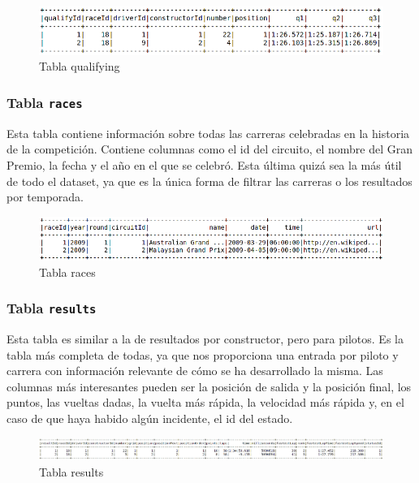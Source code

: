 \documentclass[12pt,twoside,titlepage]{report}
\begin{document}
\begin{figure}[H]
  \includegraphics[scale=0.4]{qualifying_table.png}
  \centering
  \caption{Tabla qualifying}
  \label{fig:quali}
  \centering
\end{figure}


\subsubsection{Tabla \texttt{races}}

Esta tabla contiene información sobre todas las carreras celebradas en la historia de la competición. Contiene columnas como el id del circuito, el nombre del Gran Premio, la fecha y el año en el que se celebró. Esta última quizá sea la más útil de todo el dataset, ya que es la única forma de filtrar las carreras o los resultados por temporada. 

\begin{figure}[H]
  \includegraphics[scale=0.4]{races_table.png}
  \centering
  \caption{Tabla races}
  \label{fig:races}
  \centering
\end{figure}

\subsubsection{Tabla \texttt{results}}

Esta tabla es similar a la de resultados por constructor, pero para pilotos. Es la tabla más completa de todas, ya que nos proporciona una entrada por piloto y carrera con información relevante de cómo se ha desarrollado la misma. Las columnas más interesantes pueden ser la posición de salida y la posición final, los puntos, las vueltas dadas, la vuelta más rápida, la velocidad más rápida y, en el caso de que haya habido algún incidente, el id del estado. 

\begin{figure}[H]
  \includegraphics[scale=0.27]{results_table.png}
  \centering
  \caption{Tabla results}
  \label{fig:resultstab}
  \centering
\end{figure}
\end{document}
